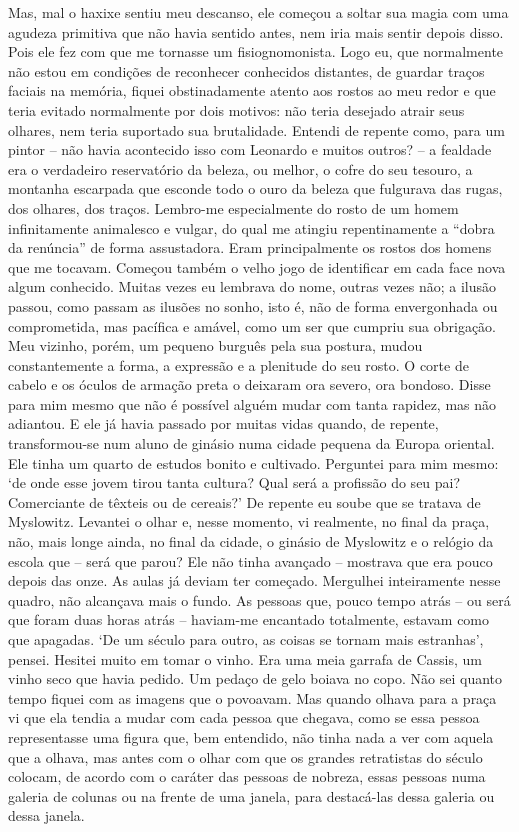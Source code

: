 Mas, mal o haxixe sentiu meu descanso, ele começou a soltar sua magia
com uma agudeza primitiva que não havia sentido antes, nem iria mais
sentir depois disso. Pois ele fez com que me tornasse um
fisiognomonista. Logo eu, que normalmente não estou em condições de
reconhecer conhecidos distantes, de guardar traços faciais na memória,
fiquei obstinadamente atento aos rostos ao meu redor e que teria evitado
normalmente por dois motivos: não teria desejado atrair seus olhares,
nem teria suportado sua brutalidade. Entendi de repente como, para um
pintor -- não havia acontecido isso com Leonardo e muitos outros? -- a
fealdade era o verdadeiro reservatório da beleza, ou melhor, o cofre do
seu tesouro, a montanha escarpada que esconde todo o ouro da beleza que
fulgurava das rugas, dos olhares, dos traços. Lembro-me especialmente do
rosto de um homem infinitamente animalesco e vulgar, do qual me atingiu
repentinamente a ``dobra da renúncia'' de forma assustadora. Eram
principalmente os rostos dos homens que me tocavam. Começou também o
velho jogo de identificar em cada face nova algum conhecido. Muitas
vezes eu lembrava do nome, outras vezes não; a ilusão passou, como
passam as ilusões no sonho, isto é, não de forma envergonhada ou
comprometida, mas pacífica e amável, como um ser que cumpriu sua
obrigação. Meu vizinho, porém, um pequeno burguês pela sua postura,
mudou constantemente a forma, a expressão e a plenitude do seu rosto. O
corte de cabelo e os óculos de armação preta o deixaram ora severo, ora
bondoso. Disse para mim mesmo que não é possível alguém mudar com tanta
rapidez, mas não adiantou. E ele já havia passado por muitas vidas
quando, de repente, transformou-se num aluno de ginásio numa cidade
pequena da Europa oriental. Ele tinha um quarto de estudos bonito e
cultivado. Perguntei para mim mesmo: `de onde esse jovem tirou tanta
cultura? Qual será a profissão do seu pai? Comerciante de têxteis ou de
cereais?' De repente eu soube que se tratava de Myslowitz. Levantei o
olhar e, nesse momento, vi realmente, no final da praça, não, mais longe
ainda, no final da cidade, o ginásio de Myslowitz e o relógio da escola
que -- será que parou? Ele não tinha avançado -- mostrava que era pouco
depois das onze. As aulas já deviam ter começado. Mergulhei inteiramente
nesse quadro, não alcançava mais o fundo. As pessoas que, pouco tempo
atrás -- ou será que foram duas horas atrás -- haviam-me encantado
totalmente, estavam como que apagadas. `De um século para outro, as
coisas se tornam mais estranhas', pensei. Hesitei muito em tomar o
vinho. Era uma meia garrafa de Cassis, um vinho seco que havia pedido.
Um pedaço de gelo boiava no copo. Não sei quanto tempo fiquei com as
imagens que o povoavam. Mas quando olhava para a praça vi que ela tendia
a mudar com cada pessoa que chegava, como se essa pessoa representasse
uma figura que, bem entendido, não tinha nada a ver com aquela que a
olhava, mas antes com o olhar com que os grandes retratistas do século~ 
colocam, de acordo com o caráter das pessoas de nobreza, essas
pessoas numa galeria de colunas ou na frente de uma janela, para
destacá-las dessa galeria ou dessa janela.

